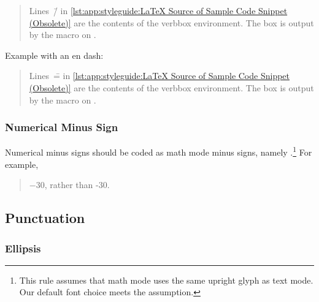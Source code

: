 \begin{quote}
\begin{fcvref}
  Lines~\=/ in
  \cref{lst:app:styleguide:LaTeX Source of Sample Code Snippet (Obsolete)}
  are the contents of the verbbox environment.
  The box is output by the \co{\\theverbbox} macro on .
\end{fcvref}
\end{quote}

Example with an en dash:

\begin{quote}
\begin{fcvref}
  Lines~\== in
  \cref{lst:app:styleguide:LaTeX Source of Sample Code Snippet (Obsolete)}
  are the contents of the verbbox environment.
  The box is output by the \co{\\theverbbox} macro on .
\end{fcvref}
\end{quote}

\subsubsection{Numerical Minus Sign}
\label{sec:app:styleguide:Numerical Minus Sign}

Numerical minus signs should be coded as math mode minus signs,
namely \qco{$-$}.\footnote{This rule assumes that math mode uses the
  same upright glyph as text mode.
  Our default font choice meets the assumption.
}
For example,

\begin{quote}
  $-30$, rather than -30.
\end{quote}

\subsection{Punctuation}
\label{sec:app:styleguide:Punctuation}

\subsubsection{Ellipsis}
\label{sec:app:styleguide:Ellipsis}

